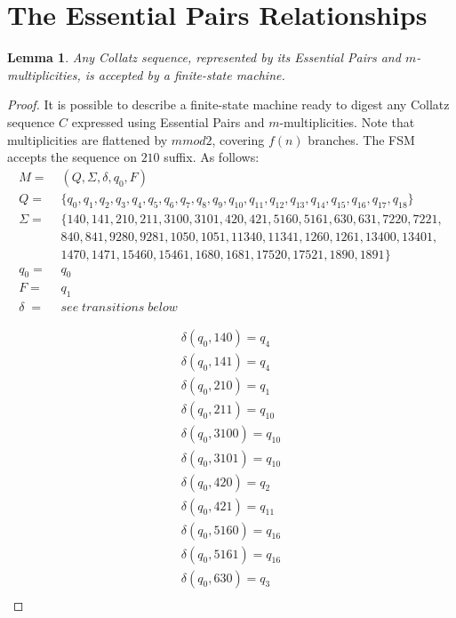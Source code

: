 \documentclass{jams-l}
\newtheorem{lemma}[theorem]{Lemma}
\theoremstyle{definition}
\theoremstyle{remark}
\numberwithin{equation}{section}
\begin{document}
    \section{The Essential Pairs Relationships}
        \begin{lemma}
            Any Collatz sequence, represented by its Essential Pairs and $m$-multiplicities, is accepted by a finite-state machine.
        \end{lemma}
	\begin{proof}
		It is possible to describe a finite-state machine ready to digest any Collatz sequence $C$ expressed using Essential Pairs and $m$-multiplicities. Note that multiplicities are flattened by $m mod 2$, covering $f(n)$ branches. The FSM accepts the sequence on $210$ suffix. As follows:
		\begin{align*}
			M =&\;(Q, \Sigma, \delta, q_{0}, F)\\
			Q =&\;\{q_{0},q_{1},q_{2},q_{3},q_{4},q_{5},q_{6},q_{7},q_{8},q_{9},q_{10},q_{11},q_{12},q_{13},q_{14},q_{15},q_{16},q_{17},q_{18}\}\\
			\Sigma =&\;\{140,141,210,211,3100,3101,420,421,5160,5161,630,631,7220,7221,\\
			&\;840,841,9280,9281,1050,1051,11340,11341,1260,1261,13400,13401,\\
			&\;1470,1471,15460,15461,1680,1681,17520,17521,1890,1891\}\\
			q_{0} =&\;q_{0}\\
			F =&\;q_{1}\\
			\delta \;=&\;see\;transitions\;below
		\end{align*}
		\begin{minipage}[b]{.45\textwidth}
			\begin{align}
				\delta(q_{0}, 140) = q_{4}\\
				\delta(q_{0}, 141) = q_{4}\\
				\delta(q_{0}, 210) = q_{1}\\
				\delta(q_{0}, 211) = q_{10}\\
				\delta(q_{0}, 3100) = q_{10}\\
				\delta(q_{0}, 3101) = q_{10}\\
				\delta(q_{0}, 420) = q_{2}\\
				\delta(q_{0}, 421) = q_{11}\\
				\delta(q_{0}, 5160) = q_{16}\\
				\delta(q_{0}, 5161) = q_{16}\\		
				\delta(q_{0}, 630) = q_{3}\\

\end{align}
\end{minipage}
\end{proof}
\end{document}
